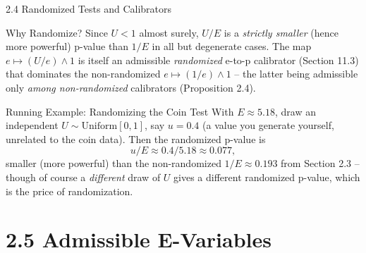 \documentclass[aspectratio=169,10pt]{beamer}
\begin{document}
\begin{frame}[allowframebreaks]{2.4 Randomized Tests and Calibrators}
  \begin{alertblock}{Why Randomize?}
    Since $U<1$ almost surely, $U/E$ is a \emph{strictly smaller} (hence
    more powerful) p-value than $1/E$ in all but degenerate cases. The map
    $e\mapsto (U/e)\wedge1$ is itself an admissible \emph{randomized}
    e-to-p calibrator (Section 11.3) that dominates the non-randomized
    $e\mapsto(1/e)\wedge1$ -- the latter being admissible only \emph{among
    non-randomized} calibrators (Proposition 2.4).
  \end{alertblock}

  \begin{exampleblock}{Running Example: Randomizing the Coin Test}
    With $E\approx5.18$, draw an independent
    $U\sim\mathrm{Uniform}[0,1]$, say $u=0.4$ (a value you generate
    yourself, unrelated to the coin data). Then the randomized p-value is
    \[
      u/E \approx 0.4/5.18 \approx 0.077,
    \]
    smaller (more powerful) than the non-randomized $1/E\approx0.193$ from
    Section 2.3 -- though of course a \emph{different} draw of $U$ gives a
    different randomized p-value, which is the price of randomization.
  \end{exampleblock}

\end{frame}

\section{2.5 Admissible E-Variables}
\end{document}
